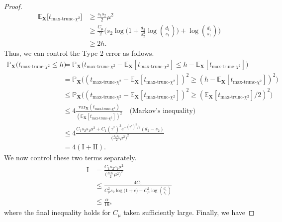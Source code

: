\documentclass{article}
\newcommand{\X}{\mathbf{X}}
\newcommand{\bbP}{\mathbb{P}}
\newcommand{\EE}{\mathbb{E}}
\newcommand{\var}{\textrm{var}}
\newcommand{\chisqmax}{\text{max-trunc-$\chi^2$}}
\theoremstyle{remark}
\begin{document}
\begin{proof}
\begin{align*}
        \EE_{\X}\big[t_{\chisqmax}\big] &\geq \frac{s_1s_2}{2}\mu^2 \\
        &\geq \frac{C_\mu}{2}\Big(s_2\log\Big(1 + \frac{d_2}{s_2^2}\log{d_1 \choose s_1}\Big) + \log {d_1 \choose s_1}\Big) \\ 
        &\geq 2h.
    \end{align*} 
    Thus, we can control the Type 2 error as follows.
    \begin{align*}
        \bbP_\X \big(t_{\chisqmax} \leq h\big) &= \bbP_\X \big(t_{\chisqmax} - \EE_\X[t_{\chisqmax}] \leq h - \EE_\X[t_{\chisqmax}]\big) \\
        &= \bbP_\X \big((t_{\chisqmax} - \EE_\X[t_{\chisqmax}])^2 \geq (h - \EE_\X[t_{\chisqmax}])^2\big) \\
        &\leq \bbP_\X \big((t_{\chisqmax} - \EE_\X[t_{\chisqmax}])^2 \geq (\EE_\X[t_{\chisqmax}] / 2)^2\big) \\
        &\leq 4 \frac{\var_\X(t_{\chisqmax})}{(\EE_\X[t_{\chisqmax}])^2} \quad \text{(Markov's inequality)} \\
        &\leq 4\frac{C_1s_2s_1\mu^2 + C_1 (\tau^*)^3e^{-(\tau^*)^2/2}(d_2 - s_2)}{\big(\frac{s_2s_1}{2}\mu^2\big)^2} \\
        &= 4(\text{I} + \text{II}).
    \end{align*}
    We now control these two terms separately.
    \begin{align*}
        \text{I} &= \frac{C_1s_2s_1\mu^2}{\big(\frac{s_2s_1}{2}\mu^2\big)^2} \\
        &\leq \frac{4C_1}{C_\mu^2s_2\log\big(1 + c\big) + C_\mu^2\log{d_1 \choose s_1}} \\
        &\leq \frac{\alpha}{16},
    \end{align*}
    where the final inequality holds for $C_\mu$ taken sufficiently large. Finally, we have 


\end{proof}
\end{document}
